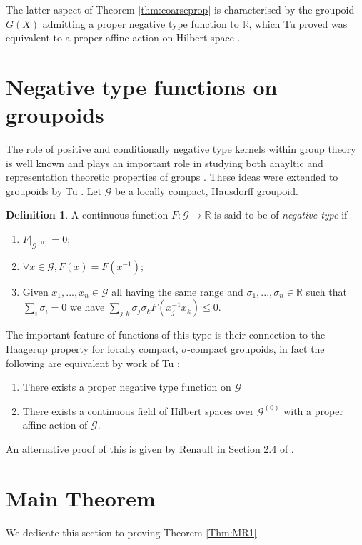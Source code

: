 \documentclass[preprint]{elsarticle}
\theoremstyle{plain}
\theoremstyle{definition}%
\newtheorem{definition}[theorem]{Definition}%
\theoremstyle{remark}%
\newcommand{\G}{\mathcal{G}}
\begin{document}
The latter aspect of Theorem \ref{thm:coarseprop} is characterised by the groupoid $G(X)$ admitting a proper negative type function to $\mathbb{R}$, which Tu proved was equivalent to a proper affine action on Hilbert space \cite{MR1703305}. 

\section{Negative type functions on groupoids}\label{sect:negtype}
The role of positive and conditionally negative type kernels within group theory is well known and plays an important role in studying both anayltic and representation theoretic properties of groups \cite{MR2415834,MR1487204}. These ideas were extended to groupoids by Tu \cite{MR1703305}. Let $\G$ be a locally compact, Hausdorff groupoid.

\begin{definition}
A continuous function $F: \G \rightarrow \mathbb{R}$ is said to be of \textit{negative type} if 
\begin{enumerate}
\item $F|_{\G^{(0)}}=0$;
\item $\forall x \in \G, F(x)=F(x^{-1})$;
\item Given $x_{1},...,x_{n} \in \G$ all having the same range and $\sigma_{1},...,\sigma_{n} \in \mathbb{R}$ such that $\sum_{i}\sigma_{i}=0$ we have $\sum_{j,k}\sigma_{j}\sigma_{k}F(x_{j}^{-1}x_{k})\leq 0$.
\end{enumerate}
\end{definition}

The important feature of functions of this type is their connection to the Haagerup property for locally compact, $\sigma$-compact groupoids, in fact the following are equivalent by work of Tu \cite{MR1703305}:
\begin{enumerate}
\item There exists a proper negative type function on $\G$
\item There exists a continuous field of Hilbert spaces over $\G^{(0)}$ with a proper affine action of $\G$.
\end{enumerate}
An alternative proof of this is given by Renault in Section 2.4 of \cite{Renault2012}.

\section{Main Theorem}
We dedicate this section to proving Theorem \ref{Thm:MR1}.
\end{document}
